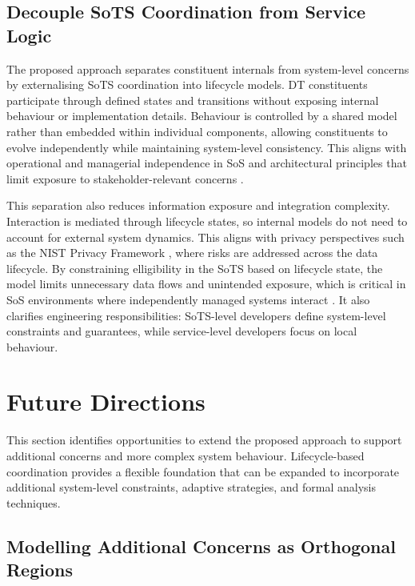 \subsection{Decouple SoTS Coordination from Service Logic}

The proposed approach separates constituent internals from system-level concerns by externalising SoTS coordination into lifecycle models. DT constituents participate through defined states and transitions without exposing internal behaviour or implementation details. Behaviour is controlled by a shared model rather than embedded within individual components, allowing constituents to evolve independently while maintaining system-level consistency. This aligns with operational and managerial independence in SoS \cite{maier1998architecting} and architectural principles that limit exposure to stakeholder-relevant concerns \cite{iso42010}.

This separation also reduces information exposure and integration complexity. Interaction is mediated through lifecycle states, so internal models do not need to account for external system dynamics. This aligns with privacy perspectives such as the NIST Privacy Framework \cite{enterprise2020nist}, where risks are addressed across the data lifecycle. By constraining elligibility in the SoTS based on lifecycle state, the model limits unnecessary data flows and unintended exposure, which is critical in SoS environments where independently managed systems interact \cite{olivero2024systematic}. It also clarifies engineering responsibilities: SoTS-level developers define system-level constraints and guarantees, while service-level developers focus on local behaviour.


\section{Future Directions}\label{sec:discussion-future}
This section identifies opportunities to extend the proposed approach to support additional concerns and more complex system behaviour. Lifecycle-based coordination provides a flexible foundation that can be expanded to incorporate additional system-level constraints, adaptive strategies, and formal analysis techniques.

\subsection{Modelling Additional Concerns as Orthogonal Regions}

